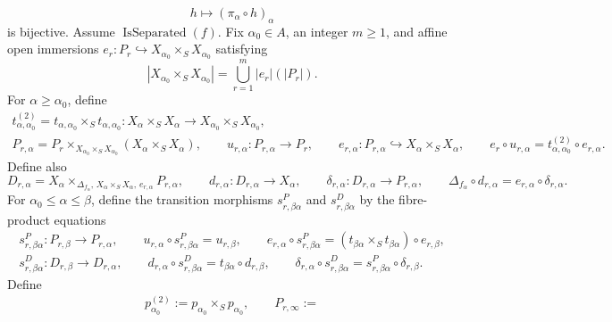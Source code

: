 \begin{definition}
\[    h\longmapsto(\pi_\alpha\circ h)_\alpha                         \tag{153b}
  \]
  is bijective.
  Assume \(\operatorname{IsSeparated}(f)\).  Fix $\alpha_0\in A$, an integer $m\geq1$,
  and affine open immersions
  $e_r\colon P_r\hookrightarrow X_{\alpha_0}\times_SX_{\alpha_0}$ satisfying
  \[
    \left|X_{\alpha_0}\times_SX_{\alpha_0}\right|
      =\bigcup_{r=1}^m |e_r|(|P_r|).                            \tag{154}
  \]
  For $\alpha\geq\alpha_0$, define
  \[
  \begin{gathered}
    t^{(2)}_{\alpha,\alpha_0}
      =t_{\alpha,\alpha_0}\times_St_{\alpha,\alpha_0}\colon
      X_\alpha\times_SX_\alpha
        \longrightarrow X_{\alpha_0}\times_SX_{\alpha_0},\\
    P_{r,\alpha}
      =P_r\times_{X_{\alpha_0}\times_SX_{\alpha_0}}
        (X_\alpha\times_SX_\alpha),
    \qquad
    u_{r,\alpha}\colon P_{r,\alpha}\to P_r,\qquad
    e_{r,\alpha}\colon P_{r,\alpha}\hookrightarrow
      X_\alpha\times_SX_\alpha,\qquad
    e_r\circ u_{r,\alpha}
      =t^{(2)}_{\alpha,\alpha_0}\circ e_{r,\alpha}.
  \end{gathered}                                                 \tag{155}
  \]
  Define also
  \[
    D_{r,\alpha}
      =X_\alpha\times_{\Delta_{f_\alpha},\,
          X_\alpha\times_SX_\alpha,\,e_{r,\alpha}}P_{r,\alpha},
    \qquad
    d_{r,\alpha}\colon D_{r,\alpha}\to X_\alpha,\qquad
    \delta_{r,\alpha}\colon D_{r,\alpha}\to P_{r,\alpha},
    \qquad
    \Delta_{f_\alpha}\circ d_{r,\alpha}
      =e_{r,\alpha}\circ\delta_{r,\alpha}.                     \tag{156}
  \]
  For $\alpha_0\leq\alpha\leq\beta$, define the transition morphisms
  $s^P_{r,\beta\alpha}$ and $s^D_{r,\beta\alpha}$ by the fibre-product
  equations
  \[
  \begin{gathered}
    s^P_{r,\beta\alpha}\colon P_{r,\beta}\to P_{r,\alpha},\qquad
    u_{r,\alpha}\circ s^P_{r,\beta\alpha}=u_{r,\beta},\qquad
    e_{r,\alpha}\circ s^P_{r,\beta\alpha}
      =(t_{\beta\alpha}\times_St_{\beta\alpha})\circ e_{r,\beta},\\
    s^D_{r,\beta\alpha}\colon D_{r,\beta}\to D_{r,\alpha},\qquad
    d_{r,\alpha}\circ s^D_{r,\beta\alpha}
      =t_{\beta\alpha}\circ d_{r,\beta},\qquad
    \delta_{r,\alpha}\circ s^D_{r,\beta\alpha}
      =s^P_{r,\beta\alpha}\circ\delta_{r,\beta}.
  \end{gathered}                                                  \tag{FS0}
  \]
  Define
  \[
  \begin{gathered}
    p_{\alpha_0}^{(2)}:=p_{\alpha_0}\times_Sp_{\alpha_0},\qquad
    P_{r,\infty}:=

\end{gathered}\]
\end{definition}
